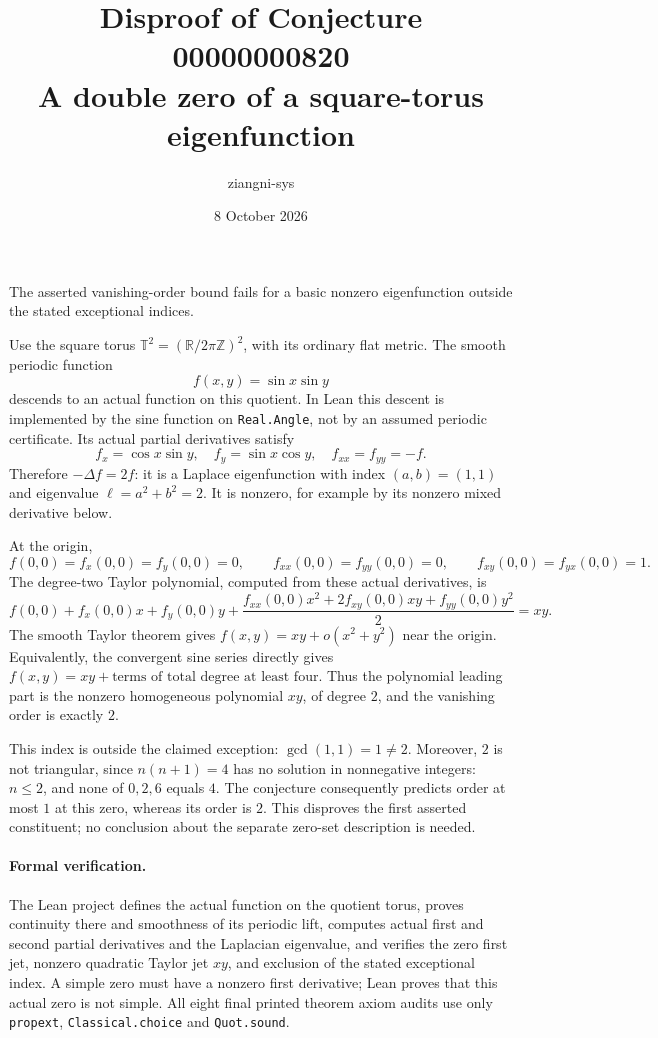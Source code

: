 \documentclass[11pt]{article}
\title{Disproof of Conjecture 00000000820\\A double zero of a square-torus eigenfunction}
\author{ziangni-sys}
\date{8 October 2026}
\begin{document}
\maketitle
The asserted vanishing-order bound fails for a basic nonzero eigenfunction outside the stated exceptional indices.

Use the square torus $\mathbb T^2=(\mathbb R/2\pi\mathbb Z)^2$, with its ordinary flat metric. The smooth periodic function
\[
 f(x,y)=\sin x\sin y
\]
descends to an actual function on this quotient. In Lean this descent is implemented by the sine function on \texttt{Real.Angle}, not by an assumed periodic certificate. Its actual partial derivatives satisfy
\[
 f_x=\cos x\sin y,\quad f_y=\sin x\cos y,
 \quad f_{xx}=f_{yy}=-f.
\]
Therefore $-\Delta f=2f$: it is a Laplace eigenfunction with index $(a,b)=(1,1)$ and eigenvalue $\ell=a^2+b^2=2$. It is nonzero, for example by its nonzero mixed derivative below.

At the origin,
\[
 f(0,0)=f_x(0,0)=f_y(0,0)=0,\qquad
 f_{xx}(0,0)=f_{yy}(0,0)=0,\qquad
 f_{xy}(0,0)=f_{yx}(0,0)=1.
\]
The degree-two Taylor polynomial, computed from these actual derivatives, is
\[
 f(0,0)+f_x(0,0)x+f_y(0,0)y+
 \frac{f_{xx}(0,0)x^2+2f_{xy}(0,0)xy+f_{yy}(0,0)y^2}{2}
 =xy.
\]
The smooth Taylor theorem gives $f(x,y)=xy+o(x^2+y^2)$ near the origin. Equivalently, the convergent sine series directly gives $f(x,y)=xy+\text{terms of total degree at least four}$. Thus the polynomial leading part is the nonzero homogeneous polynomial $xy$, of degree $2$, and the vanishing order is exactly $2$.

This index is outside the claimed exception: $\gcd(1,1)=1\ne2$. Moreover, $2$ is not triangular, since $n(n+1)=4$ has no solution in nonnegative integers: $n\le2$, and none of $0,2,6$ equals $4$. The conjecture consequently predicts order at most $1$ at this zero, whereas its order is $2$. This disproves the first asserted constituent; no conclusion about the separate zero-set description is needed.

\paragraph{Formal verification.}
The Lean project defines the actual function on the quotient torus, proves continuity there and smoothness of its periodic lift, computes actual first and second partial derivatives and the Laplacian eigenvalue, and verifies the zero first jet, nonzero quadratic Taylor jet $xy$, and exclusion of the stated exceptional index. A simple zero must have a nonzero first derivative; Lean proves that this actual zero is not simple. All eight final printed theorem axiom audits use only \texttt{propext}, \texttt{Classical.choice} and \texttt{Quot.sound}.
\end{document}
